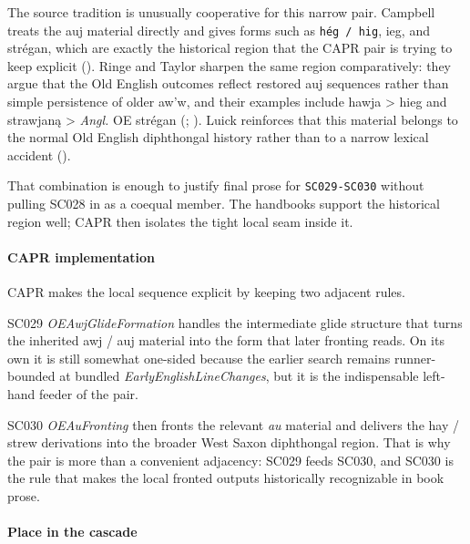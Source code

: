 \documentclass[
  british,
  a4paper,
]{article}
\begin{document}
The source tradition is unusually cooperative for this narrow pair.
Campbell treats the auj material directly and gives forms such as
\texttt{hég\ /\ hig}, ieg, and strégan, which are exactly the historical
region that the CAPR pair is trying to keep explicit
(). Ringe and
Taylor sharpen the same region comparatively: they argue that the Old
English outcomes reflect restored auj sequences rather than simple
persistence of older aw'w, and their examples include hawja
\textgreater{} hieg and strawjaną \textgreater{} \emph{Angl.} OE strégan
(;
). Luick reinforces
that this material belongs to the normal Old English diphthongal history
rather than to a narrow lexical accident ().

That combination is enough to justify final prose for
\texttt{SC029-SC030} without pulling SC028 in as a coequal member. The
handbooks support the historical region well; CAPR then isolates the
tight local seam inside it.

\paragraph{CAPR implementation}\label{capr-implementation-21}

CAPR makes the local sequence explicit by keeping two adjacent rules.

SC029 \emph{OEAwjGlideFormation} handles the intermediate glide
structure that turns the inherited awj / auj material into the form that
later fronting reads. On its own it is still somewhat one-sided because
the earlier search remains runner-bounded at bundled
\emph{EarlyEnglishLineChanges}, but it is the indispensable left-hand
feeder of the pair.

SC030 \emph{OEAuFronting} then fronts the relevant \emph{au} material
and delivers the hay / strew derivations into the broader West Saxon
diphthongal region. That is why the pair is more than a convenient
adjacency: SC029 feeds SC030, and SC030 is the rule that makes the local
fronted outputs historically recognizable in book prose.

\paragraph{Place in the cascade}\label{place-in-the-cascade-21}
\end{document}
